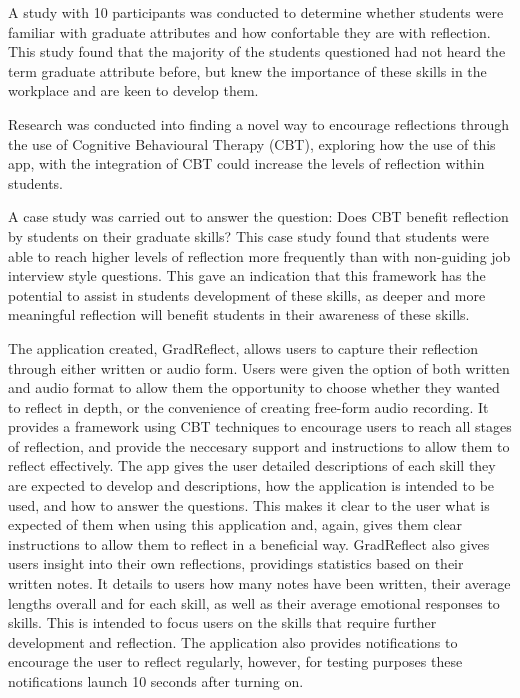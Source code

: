 \documentclass{l4proj}
\begin{document}
A study with 10 participants was conducted to determine whether students were familiar with graduate attributes and how confortable they are with reflection. This study found that the majority of the students questioned had not heard the term graduate attribute before, but knew the importance of these skills in the workplace and are keen to develop them.

Research was conducted into finding a novel way to encourage reflections through the use of Cognitive Behavioural Therapy (CBT), exploring how the use of this app, with the integration of CBT could increase the levels of reflection within students. 

A case study was carried out to answer the question: Does CBT benefit reflection by students on their graduate skills? This case study found that students were able to reach higher levels of reflection more frequently than with non-guiding job interview style questions. This gave an indication that this framework has the potential to assist in students development of these skills, as deeper and more meaningful reflection will benefit students in their awareness of these skills.

The application created, GradReflect, allows users to capture their reflection through either written or audio form. Users were given the option of both written and audio format to allow them the opportunity to choose whether they wanted to reflect in depth, or the convenience of creating free-form audio recording. It provides a framework using CBT techniques to encourage users to reach all stages of reflection, and provide the neccesary support and instructions to allow them to reflect effectively. The app gives the user detailed descriptions of each skill they are expected to develop and descriptions, how the application is intended to be used, and how to answer the questions. This makes it clear to the user what is expected of them when using this application and, again, gives them clear instructions to allow them to reflect in a beneficial way. GradReflect also gives users insight into their own reflections, providings statistics based on their written notes. It details to users how many notes have been written, their average lengths overall and for each skill, as well as their average emotional responses to skills. This is intended to focus users on the skills that require further development and reflection. The application also provides notifications to encourage the user to reflect regularly, however, for testing purposes these notifications launch 10 seconds after turning on.
\end{document}
